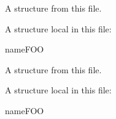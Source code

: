 \documentclass[minimal]{omdoc}
\begin{document}


A structure from this file.
\begin{module}[id=bar]
A structure local in this file:
\begin{sstructure}{name}{FOO}
\end{sstructure}
\end{module}

A structure from this file.
\begin{module}[id=baz]
A structure local in this file:
\begin{sstructure}[load=../modules/FOO]{name}{FOO}
\end{sstructure}
\end{module}
\end{document}
